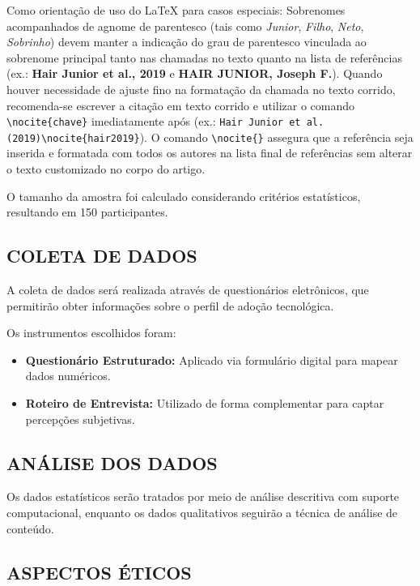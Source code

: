 Como orientação de uso do LaTeX para casos especiais: Sobrenomes acompanhados de agnome de parentesco (tais como \textit{Junior}, \textit{Filho}, \textit{Neto}, \textit{Sobrinho}) devem manter a indicação do grau de parentesco vinculada ao sobrenome principal tanto nas chamadas no texto quanto na lista de referências (ex.: \textbf{Hair Junior et al., 2019} e \textbf{HAIR JUNIOR, Joseph F.}). Quando houver necessidade de ajuste fino na formatação da chamada no texto corrido, recomenda-se escrever a citação em texto corrido e utilizar o comando \verb|\nocite{chave}| imediatamente após (ex.: \verb|Hair Junior et al. (2019)\nocite{hair2019}|). O comando \verb|\nocite{}| assegura que a referência seja inserida e formatada com todos os autores na lista final de referências sem alterar o texto customizado no corpo do artigo.

O tamanho da amostra foi calculado considerando critérios estatísticos, resultando em 150 participantes.

\subsection{COLETA DE DADOS}
\label{subsec:coleta-dados}

A coleta de dados será realizada através de questionários eletrônicos, que permitirão obter informações sobre o perfil de adoção tecnológica.

Os instrumentos escolhidos foram:
\begin{itemize}
    \item \textbf{Questionário Estruturado:} Aplicado via formulário digital para mapear dados numéricos.
    \item \textbf{Roteiro de Entrevista:} Utilizado de forma complementar para captar percepções subjetivas.
\end{itemize}

\subsection{ANÁLISE DOS DADOS}
\label{subsec:análise}

Os dados estatísticos serão tratados por meio de análise descritiva com suporte computacional, enquanto os dados qualitativos seguirão a técnica de análise de conteúdo.

\subsection{ASPECTOS ÉTICOS}
\label{subsec:aspectos-eticos}

